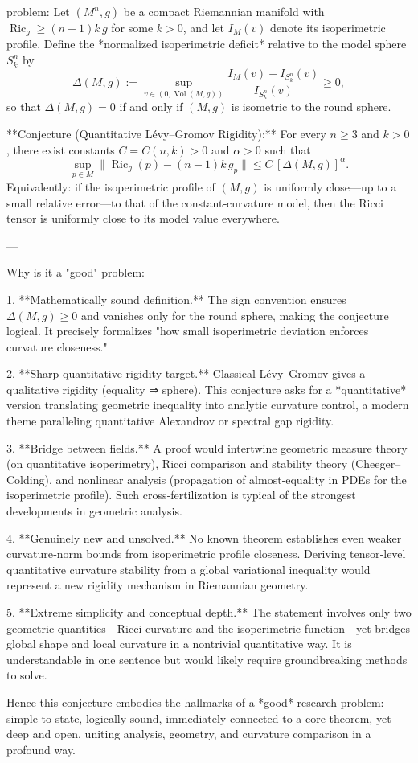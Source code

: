 problem:  
Let \((M^n,g)\) be a compact Riemannian manifold with \(\operatorname{Ric}_g \ge (n-1)k\, g\) for some \(k>0\), and let \(I_M(v)\) denote its isoperimetric profile.  
Define the *normalized isoperimetric deficit* relative to the model sphere \(S_k^n\) by  
\[
\Delta(M,g) := \sup_{v\in(0,\operatorname{Vol}(M,g))} \frac{I_M(v)-I_{S_k^n}(v)}{I_{S_k^n}(v)} \ge 0,
\]
so that \(\Delta(M,g)=0\) if and only if \((M,g)\) is isometric to the round sphere.

**Conjecture (Quantitative Lévy–Gromov Rigidity):**  
For every \(n\ge 3\) and \(k>0\), there exist constants \(C=C(n,k)>0\) and \(\alpha>0\) such that  
\[
\sup_{p\in M}\|\operatorname{Ric}_g(p) - (n-1)k\, g_p\| \le C\, [\Delta(M,g)]^{\alpha}.
\]  
Equivalently: if the isoperimetric profile of \((M,g)\) is uniformly close—up to a small relative error—to that of the constant‑curvature model, then the Ricci tensor is uniformly close to its model value everywhere.

---

Why is it a "good" problem:  

1. **Mathematically sound definition.**  
   The sign convention ensures \(\Delta(M,g)\ge 0\) and vanishes only for the round sphere, making the conjecture logical. It precisely formalizes "how small isoperimetric deviation enforces curvature closeness."

2. **Sharp quantitative rigidity target.**  
   Classical Lévy–Gromov gives a qualitative rigidity (equality ⇒ sphere). This conjecture asks for a *quantitative* version translating geometric inequality into analytic curvature control, a modern theme paralleling quantitative Alexandrov or spectral gap rigidity.

3. **Bridge between fields.**  
   A proof would intertwine geometric measure theory (on quantitative isoperimetry), Ricci comparison and stability theory (Cheeger–Colding), and nonlinear analysis (propagation of almost‑equality in PDEs for the isoperimetric profile). Such cross‑fertilization is typical of the strongest developments in geometric analysis.

4. **Genuinely new and unsolved.**  
   No known theorem establishes even weaker curvature‑norm bounds from isoperimetric profile closeness. Deriving tensor‑level quantitative curvature stability from a global variational inequality would represent a new rigidity mechanism in Riemannian geometry.

5. **Extreme simplicity and conceptual depth.**  
   The statement involves only two geometric quantities—Ricci curvature and the isoperimetric function—yet bridges global shape and local curvature in a nontrivial quantitative way. It is understandable in one sentence but would likely require groundbreaking methods to solve.

Hence this conjecture embodies the hallmarks of a *good* research problem: simple to state, logically sound, immediately connected to a core theorem, yet deep and open, uniting analysis, geometry, and curvature comparison in a profound way.